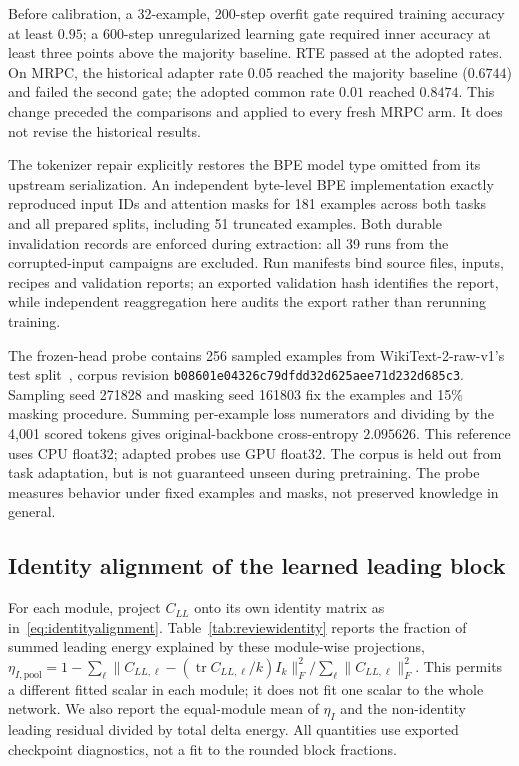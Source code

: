 \documentclass{article}
\begin{document}
Before calibration, a 32-example, 200-step overfit gate required training accuracy at least $0.95$; a 600-step unregularized learning gate required inner accuracy at least three points above the majority baseline. RTE passed at the adopted rates. On MRPC, the historical adapter rate $0.05$ reached the majority baseline ($0.6744$) and failed the second gate; the adopted common rate $0.01$ reached $0.8474$. This change preceded the comparisons and applied to every fresh MRPC arm. It does not revise the historical results.

The tokenizer repair explicitly restores the BPE model type omitted from its upstream serialization. An independent byte-level BPE implementation exactly reproduced input IDs and attention masks for 181 examples across both tasks and all prepared splits, including 51 truncated examples. Both durable invalidation records are enforced during extraction: all 39 runs from the corrupted-input campaigns are excluded. Run manifests bind source files, inputs, recipes and validation reports; an exported validation hash identifies the report, while independent reaggregation here audits the export rather than rerunning training.

The frozen-head probe contains 256 sampled examples from WikiText-2-raw-v1's test split~\citep{merity2017pointer}, corpus revision \texttt{b08601e04326c79dfdd32d625aee71d232d685c3}. Sampling seed 271828 and masking seed 161803 fix the examples and 15\% masking procedure. Summing per-example loss numerators and dividing by the 4{,}001 scored tokens gives original-backbone cross-entropy $2.095626$. This reference uses CPU float32; adapted probes use GPU float32. The corpus is held out from task adaptation, but is not guaranteed unseen during pretraining. The probe measures behavior under fixed examples and masks, not preserved knowledge in general.

\subsection{Identity alignment of the learned leading block}
\label{app:reviewidentity}
For each module, project $C_{LL}$ onto its own identity matrix as in~\eqref{eq:identityalignment}. Table~\ref{tab:reviewidentity} reports the fraction of summed leading energy explained by these module-wise projections, $\eta_{I,\mathrm{pool}}=1-\sum_\ell\|C_{LL,\ell}-(\operatorname{tr}C_{LL,\ell}/k)I_k\|_F^2/\sum_\ell\|C_{LL,\ell}\|_F^2$. This permits a different fitted scalar in each module; it does not fit one scalar to the whole network. We also report the equal-module mean of $\eta_I$ and the non-identity leading residual divided by total delta energy. All quantities use exported checkpoint diagnostics, not a fit to the rounded block fractions.
\end{document}
